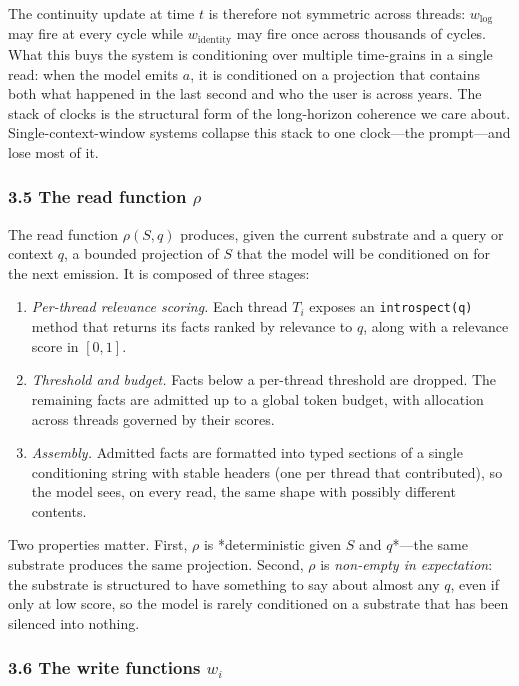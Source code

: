 \documentclass[11pt,letterpaper]{article}
\begin{document}
The continuity update at time $t$ is therefore not symmetric across threads: $w_{\text{log}}$ may fire at every cycle while $w_{\text{identity}}$ may fire once across thousands of cycles. What this buys the system is conditioning over multiple time-grains in a single read: when the model emits $a$, it is conditioned on a projection that contains both what happened in the last second and who the user is across years. The stack of clocks is the structural form of the long-horizon coherence we care about. Single-context-window systems collapse this stack to one clock---the prompt---and lose most of it.

\subsubsection*{3.5 The read function $\rho$}

The read function $\rho(S, q)$ produces, given the current substrate and a query or context $q$, a bounded projection of $S$ that the model will be conditioned on for the next emission. It is composed of three stages:

\begin{enumerate}
  \item \emph{Per-thread relevance scoring.} Each thread $T_i$ exposes an \texttt{introspect(q)} method that returns its facts ranked by relevance to $q$, along with a relevance score in $[0,1]$.
  \item \emph{Threshold and budget.} Facts below a per-thread threshold are dropped. The remaining facts are admitted up to a global token budget, with allocation across threads governed by their scores.
  \item \emph{Assembly.} Admitted facts are formatted into typed sections of a single conditioning string with stable headers (one per thread that contributed), so the model sees, on every read, the same shape with possibly different contents.
\end{enumerate}

Two properties matter. First, $\rho$ is *deterministic given $S$ and $q$*---the same substrate produces the same projection. Second, $\rho$ is \emph{non-empty in expectation}: the substrate is structured to have something to say about almost any $q$, even if only at low score, so the model is rarely conditioned on a substrate that has been silenced into nothing.

\subsubsection*{3.6 The write functions $w_i$}
\end{document}
